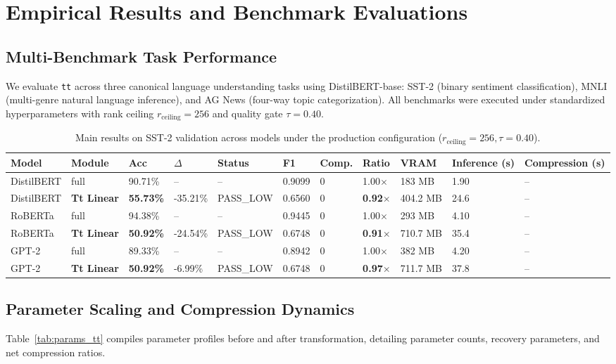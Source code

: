\section{Empirical Results and Benchmark Evaluations}
\label{sec:results}

\subsection{Multi-Benchmark Task Performance}
We evaluate \texttt{tt} across three canonical language understanding tasks using DistilBERT-base: SST-2 (binary sentiment classification), MNLI (multi-genre natural language inference), and AG News (four-way topic categorization). All benchmarks were executed under standardized hyperparameters with rank ceiling $r_{\mathrm{ceiling}} = 256$ and quality gate $\tau = 0.40$.

\begin{table}[t]
\centering
\small
\begin{tabular}{lllllllllll}
\toprule
\textbf{Model} & \textbf{Module} & \textbf{Acc} & \textbf{$\Delta$} & \textbf{Status} & \textbf{F1} & \textbf{Comp.} & \textbf{Ratio} & \textbf{VRAM} & \textbf{Inference (s)} & \textbf{Compression (s)} \\
\midrule
DistilBERT & full & 90.71\% & -- & -- & 0.9099 & 0 & 1.00$\times$ & 183 MB & 1.90 & -- \\
DistilBERT & \textbf{Tt Linear} & \textbf{55.73\%} & -35.21\% & PASS\_LOW & 0.6560 & 0 & \textbf{0.92$\times$} & 404.2 MB & 24.6 & -- \\
RoBERTa & full & 94.38\% & -- & -- & 0.9445 & 0 & 1.00$\times$ & 293 MB & 4.10 & -- \\
RoBERTa & \textbf{Tt Linear} & \textbf{50.92\%} & -24.54\% & PASS\_LOW & 0.6748 & 0 & \textbf{0.91$\times$} & 710.7 MB & 35.4 & -- \\
GPT-2 & full & 89.33\% & -- & -- & 0.8942 & 0 & 1.00$\times$ & 382 MB & 4.20 & -- \\
GPT-2 & \textbf{Tt Linear} & \textbf{50.92\%} & -6.99\% & PASS\_LOW & 0.6748 & 0 & \textbf{0.97$\times$} & 711.7 MB & 37.8 & -- \\
\bottomrule
\end{tabular}
\caption{Main results on SST-2 validation across models under the production configuration ($r_{\mathrm{ceiling}}=256, \tau=0.40$).}
\label{tab:main_sst2}
\end{table}

\subsection{Parameter Scaling and Compression Dynamics}
Table~\ref{tab:params_tt} compiles parameter profiles before and after transformation, detailing parameter counts, recovery parameters, and net compression ratios.

